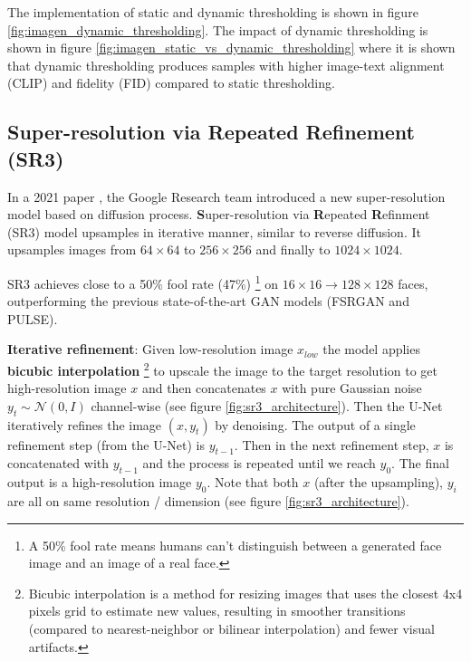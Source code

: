The implementation of static and dynamic thresholding is shown in figure \ref{fig:imagen_dynamic_thresholding}. The impact of dynamic thresholding is shown in figure \ref{fig:imagen_static_vs_dynamic_thresholding} where it is shown that dynamic thresholding produces samples with higher image-text alignment (CLIP) and fidelity (FID) compared to static thresholding.
















\subsection{Super-resolution via Repeated Refinement (SR3)}

\label{subsec:imagen_sr3}

In a 2021 paper \cite{sr3}, the Google Research team introduced a new super-resolution model based on diffusion process. \textbf{S}uper-resolution via \textbf{R}epeated \textbf{R}efinment (SR3) model upsamples in iterative manner, similar to reverse diffusion. It upsamples images from $64\times 64$ to $256\times 256$ and finally to $1024\times 1024$.

SR3 achieves close to a 50\% fool rate (47\%) \footnote{A 50\% fool rate means humans can't distinguish between a generated face image and an image of a real face.} on $16\times 16 \rightarrow 128\times 128$ faces, outperforming the previous state-of-the-art GAN models (FSRGAN and PULSE).

\textbf{Iterative refinement}: Given low-resolution image $x_{low}$ the model applies \textbf{bicubic interpolation} \footnote{Bicubic interpolation is a method for resizing images that uses the closest 4x4 pixels grid to estimate new values, resulting in smoother transitions (compared to nearest-neighbor or bilinear interpolation) and fewer visual artifacts.} to upscale the image to the target resolution to get high-resolution image $x$ and then concatenates $x$ with pure Gaussian noise $y_t \sim \mathcal{N} (0, I)$ channel-wise (see figure \ref{fig:sr3_architecture}). Then the U-Net iteratively refines the image $(x, y_t)$ by denoising. The output of a single refinement step (from the U-Net) is $y_{t-1}$. Then in the next refinement step, $x$ is concatenated with $y_{t-1}$ and the process is repeated until we reach $y_0$. The final output is a high-resolution image $y_0$. Note that both $x$ (after the upsampling), $y_i$ are all on same resolution / dimension (see figure \ref{fig:sr3_architecture}).

